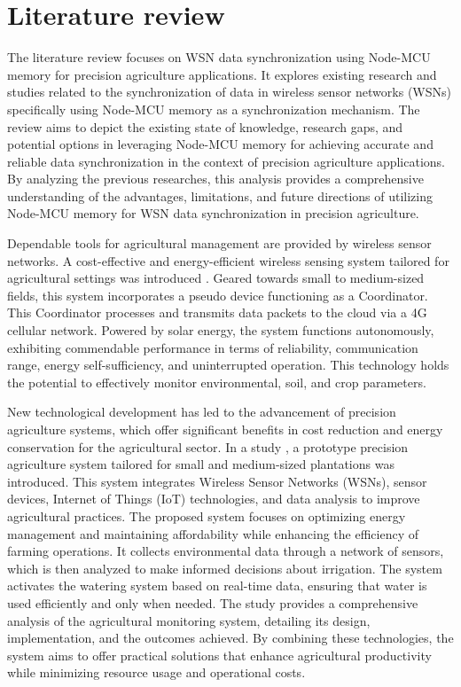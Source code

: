 \section{Literature review}
The literature review focuses on WSN data synchronization using Node-MCU memory for precision agriculture applications. It explores existing research and studies related to the synchronization of data in wireless sensor networks (WSNs) specifically using Node-MCU memory as a synchronization mechanism. The review aims to depict the existing state of knowledge, research gaps, and potential options in leveraging Node-MCU memory for achieving accurate and reliable data synchronization in the context of precision agriculture applications. By analyzing the previous researches, this analysis provides a comprehensive understanding of the advantages, limitations, and future directions of utilizing Node-MCU memory for WSN data synchronization in precision agriculture.

Dependable tools for agricultural management are provided by wireless sensor networks. A cost-effective and energy-efficient wireless sensing system tailored for agricultural settings was introduced \cite{tagarakis2021low}. Geared towards small to medium-sized fields, this system incorporates a pseudo device functioning as a Coordinator. This Coordinator processes and transmits data packets to the cloud via a 4G cellular network. Powered by solar energy, the system functions autonomously, exhibiting commendable performance in terms of reliability, communication range, energy self-sufficiency, and uninterrupted operation. This technology holds the potential to effectively monitor environmental, soil, and crop parameters.

New technological development has led to the advancement of precision agriculture systems, which offer significant benefits in cost reduction and energy conservation for the agricultural sector. In a study \cite{rodriguez2020autonomous}, a prototype precision agriculture system tailored for small and medium-sized plantations was introduced. This system integrates Wireless Sensor Networks (WSNs), sensor devices, Internet of Things (IoT) technologies, and data analysis to improve agricultural practices. The proposed system focuses on optimizing energy management and maintaining affordability while enhancing the efficiency of farming operations. It collects environmental data through a network of sensors, which is then analyzed to make informed decisions about irrigation. The system activates the watering system based on real-time data, ensuring that water is used efficiently and only when needed. The study provides a comprehensive analysis of the agricultural monitoring system, detailing its design, implementation, and the outcomes achieved. By combining these technologies, the system aims to offer practical solutions that enhance agricultural productivity while minimizing resource usage and operational costs.

